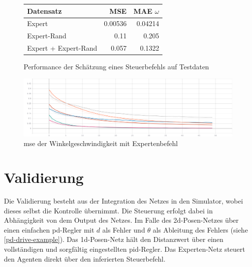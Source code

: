 \begin{figure}[H]
	\centering
	\begin{tabular}[t]{|l|r|r|}
		\hline
		Datensatz & MSE & MAE $\omega$ \\
		\hline
		Expert & 0.00536 & 0.04214 \\
		\hline
		Expert-Rand & 0.11 & 0.205 \\
		\hline
		Expert + Expert-Rand & 0.057 & 0.1322 \\
		\hline
	\end{tabular}
	\caption{Performance der Schätzung eines Steuerbefehls auf Testdaten}
	\label{expert-performance}
\end{figure}

\begin{figure}[H]
	\centering
	\includegraphics[width=\linewidth]{kapitel5/images/tensorboard/expert/Loss-expert.png}
	\caption{\acs{mse} der Winkelgeschwindigkeit mit Expertenbefehl}
	\label{expert-mse-omega}
\end{figure}


\section{Validierung}

Die Validierung besteht aus der Integration des Netzes in den Simulator, wobei dieses selbst die Kontrolle übernimmt. Die Steuerung erfolgt dabei in Abhängigkeit von dem Output des Netzes. Im Falle des \acs{2d}-Posen-Netzes über einen einfachen \acs{pd}-Regler mit $d$ als Fehler und $\theta$ als Ableitung des Fehlers (siehe \ref{pd-drive-example}). Das \acs{1d}-Posen-Netz hält den Distanzwert über einen vollständigen und sorgfältig eingestellten \acs{pid}-Regler. Das Experten-Netz steuert den Agenten direkt über den inferierten Steuerbefehl.

